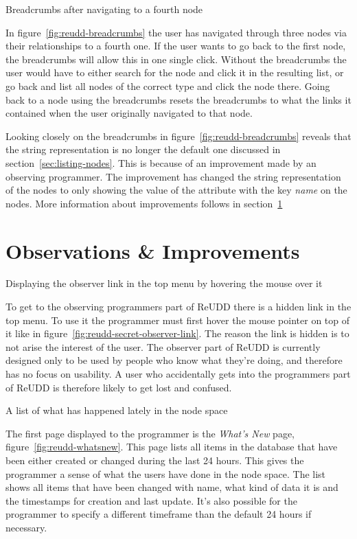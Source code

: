 \documentclass[a4paper]{report}
\begin{document}
	{Breadcrumbs after navigating to a fourth node}

In figure~\ref{fig:reudd-breadcrumbs} the user has navigated through three nodes via their relationships to a fourth one. If the user wants to go back to the first node, the breadcrumbs will allow this in one single click. Without the breadcrumbs the user would have to either search for the node and click it in the resulting list, or go back and list all nodes of the correct type and click the node there. Going back to a node using the breadcrumbs resets the breadcrumbs to what the links it contained when the user originally navigated to that node.

Looking closely on the breadcrumbs in figure~\ref{fig:reudd-breadcrumbs} reveals that the string representation is no longer the default one discussed in section~\ref{sec:listing-nodes}. This is because of an improvement made by an observing programmer. The improvement has changed the string representation of the nodes to only showing the value of the attribute with the key \emph{name} on the nodes. More information about improvements follows in section~\ref{sec:observations-improvements}

\section{Observations \& Improvements} \label{sec:observations-improvements}
	{Displaying the observer link in the top menu by hovering the mouse over it}

To get to the observing programmers part of ReUDD there is a hidden link in the top menu. To use it the programmer must first hover the mouse pointer on top of it like in figure~\ref{fig:reudd-secret-observer-link}. The reason the link is hidden is to not arise the interest of the user. The observer part of ReUDD is currently designed only to be used by people who know what they're doing, and therefore has no focus on usability. A user who accidentally gets into the programmers part of ReUDD is therefore likely to get lost and confused.

	{A list of what has happened lately in the node space}

The first page displayed to the programmer is the \emph{What's New} page, figure~\ref{fig:reudd-whatsnew}. This page lists all items in the database that have been either created or changed during the last 24 hours. This gives the programmer a sense of what the users have done in the node space. The list shows all items that have been changed with name, what kind of data it is and the timestamps for creation and last update. It's also possible for the programmer to specify a different timeframe than the default 24 hours if necessary.
\end{document}
